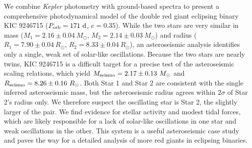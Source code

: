 We combine \emph{Kepler} photometry with ground-based spectra to present a comprehensive photodynamical model of the double red giant eclipsing binary KIC 9246715 ($P_{\rm{orb}} = 171 \ \rm{d}$, $e = 0.35$). While the two stars are very similar in mass ($M_1 = 2.16 \pm 0.04\ M_{\odot}$, $M_2 = 2.14 \pm 0.03\ M_{\odot}$) and radius ($R_1 = 7.90 \pm 0.04 \ R_{\odot}$, $R_2 = 8.33 \pm 0.04 \ R_{\odot}$), an asteroseismic analysis identifies only a single, weak set of solar-like oscillations. Because the two stars are nearly twins, KIC 9246715 is a difficult target for a precise test of the asteroseismic scaling relations, which yield $M_{\rm{seismo}} = 2.17 \pm 0.13 \ M_{\odot}$ and $R_{\rm{seismo}} = 8.26 \pm 0.16 \ R_{\odot}$. Both Star 1 and Star 2 are consistent with the single inferred asteroseismic mass, but the asteroseismic radius agrees within $2 \sigma$ of Star 2's radius only. We therefore suspect the oscillating star is Star 2, the slightly larger of the pair. We find evidence for stellar activity and modest tidal forces, which are likely responsible for a lack of solar-like oscillations in one star and weak oscillations in the other. This system is a useful asteroseismic case study and paves the way for a detailed analysis of more red giants in eclipsing binaries.
    
    
  
  
  
  